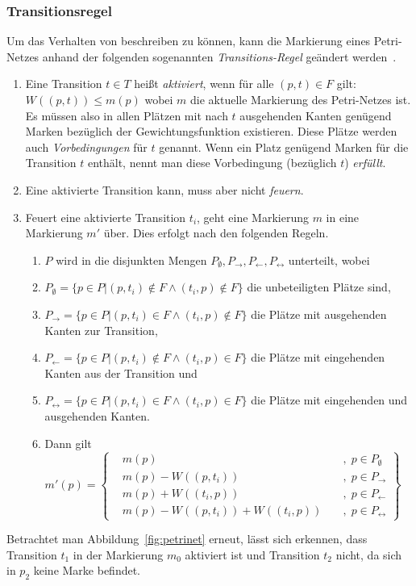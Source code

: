 \subsubsection{Transitionsregel} Um das Verhalten von  beschreiben zu können, kann die Markierung eines Petri-Netzes anhand der folgenden sogenannten \emph{Transitions-Regel} geändert werden~\cite{Murata1989}.
\begin{enumerate}
	\item Eine Transition $t \in T$ heißt \emph{aktiviert}, wenn für alle $(p,t) \in F $ gilt: $ W((p,t)) \leq m(p)$ wobei $m$ die aktuelle Markierung des Petri-Netzes ist. Es müssen also in allen Plätzen mit nach $t$ ausgehenden Kanten genügend Marken bezüglich der Gewichtungsfunktion existieren. Diese Plätze werden auch \emph{Vorbedingungen} für $t$ genannt. Wenn ein Platz genügend Marken für die Transition $t$ enthält, nennt man diese Vorbedingung (bezüglich $t$) \emph{erfüllt}.
	\item Eine aktivierte Transition kann, muss aber nicht \emph{feuern}.
	\item Feuert eine aktivierte Transition $t_i$, geht eine Markierung $m$ in eine Markierung $m'$ über. Dies erfolgt nach den folgenden Regeln.
	\begin{enumerate}
		\item $P$ wird in die disjunkten Mengen $P_\emptyset, P_\rightarrow, P_\leftarrow, P_\leftrightarrow$ unterteilt, wobei 
		\item $P_\emptyset = \{p \in P | (p,t_i) \notin F \land (t_i,p) \notin F\}$ die unbeteiligten Plätze sind,
		\item $P_\rightarrow = \{p \in P | (p,t_i) \in F \land (t_i,p) \notin F\}$ die Plätze mit ausgehenden Kanten zur Transition,
		\item $P_\leftarrow = \{p \in P | (p,t_i) \notin F \land (t_i,p) \in F\}$ die Plätze mit eingehenden Kanten aus der Transition und 
		\item $P_\leftrightarrow = \{p \in P | (p,t_i) \in F \land (t_i,p) \in F\}$ die Plätze mit eingehenden und ausgehenden Kanten.
		\item Dann gilt $
			m'(p) = \left\{ 
				\begin{aligned}
					& m(p) && \; , \; p \in P_\emptyset\\
					& m(p)-W((p,t_i)) && \; , \; p \in P_\rightarrow\\
					& m(p)+W((t_i,p)) && \; , \; p \in P_\leftarrow\\
					& m(p)-W((p,t_i))+W((t_i,p)) && \; , \; p \in P_\leftrightarrow
				\end{aligned}
				\right\}
		$
	\end{enumerate}
\end{enumerate}
Betrachtet man Abbildung~\ref{fig:petrinet} erneut, lässt sich erkennen, dass Transition $t_1$ in der Markierung $m_0$ aktiviert ist und Transition $t_2$ nicht, da sich in $p_2$ keine Marke befindet.


